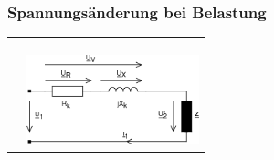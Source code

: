 		\subsubsection{Spannungsänderung bei Belastung}
			\begin{tabular}{p{10cm}p{6cm}}
            		\begin{minipage}{10cm}
	            		\fbox{$\underline{U}_1 =
	            		\underline{U}_R+\underline{U}_X+\underline{U}_2'$} \qquad
	            		\fbox{$\underline{U}_2'=\underline{U}_2 \cdot "u$}\\ \\
	            		\fbox{$\underline{U}_R=R_k \cdot \underline{I}_1$} \qquad
	            		\fbox{$\underline{U}_X=jX_k \cdot \underline{I}_1$}\qquad
	            		\fbox{$\underline{I}_2' = \underline{I}_1$}\\
	            		\end{minipage} &
            		\begin{minipage}{6cm}
	            		\includegraphics[width=5cm]{bilder/ErsatzschaltbildTrafoLast.png}
	            	\end{minipage}\\			
            \end{tabular}\\ \\

